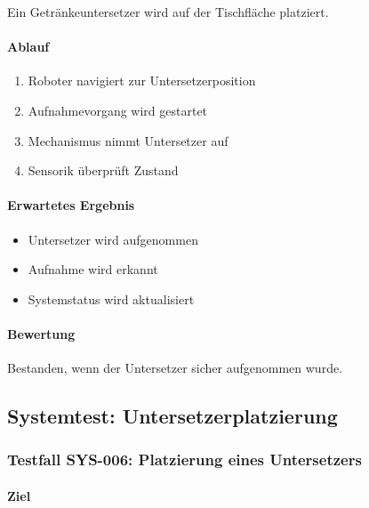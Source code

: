\documentclass[
  a4paper,
  12pt,
  DIV=12,        %
  parskip=half,  %
  headings=small %
]{scrartcl}
\theoremstyle{definition}
\providecommand{\tightlist}{%
  \setlength{\itemsep}{0pt}\setlength{\parskip}{0pt}}
\theoremstyle{definition}
\begin{document}
Ein Getränkeuntersetzer wird auf der Tischfläche platziert.

\paragraph{Ablauf}\label{ablauf-28}

\begin{enumerate}
\def\labelenumi{\arabic{enumi}.}
\tightlist
\item
  Roboter navigiert zur Untersetzerposition
\item
  Aufnahmevorgang wird gestartet
\item
  Mechanismus nimmt Untersetzer auf
\item
  Sensorik überprüft Zustand
\end{enumerate}

\paragraph{Erwartetes Ergebnis}\label{erwartetes-ergebnis-28}

\begin{itemize}
\tightlist
\item
  Untersetzer wird aufgenommen
\item
  Aufnahme wird erkannt
\item
  Systemstatus wird aktualisiert
\end{itemize}

\paragraph{Bewertung}\label{bewertung-28}

Bestanden, wenn der Untersetzer sicher aufgenommen wurde.

\subsection{Systemtest:
Untersetzerplatzierung}\label{systemtest-untersetzerplatzierung}

\subsubsection{Testfall SYS-006: Platzierung eines
Untersetzers}\label{testfall-sys-006-platzierung-eines-untersetzers}

\paragraph{Ziel}\label{ziel-29}
\end{document}
